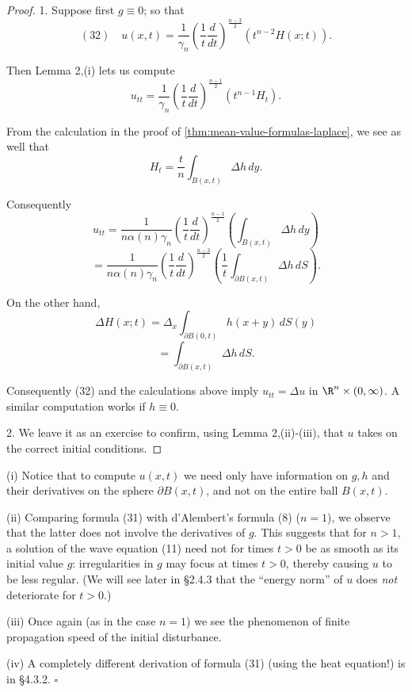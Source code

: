 \begin{proof}
1. Suppose first $g \equiv 0$; so that
$$(32) \quad u(x,t) = \frac{1}{\gamma_n}\left(\frac{1}{t}\frac{d}{dt}\right)^{\frac{n-3}{2}}\left(t^{n-2}H(x;t)\right).$$

Then Lemma 2,(i) lets us compute
$$u_{tt} = \frac{1}{\gamma_n}\left(\frac{1}{t}\frac{d}{dt}\right)^{\frac{n-1}{2}}\left(t^{n-1}H_t\right).$$

From the calculation in the proof of \cref{thm:mean-value-formulas-laplace}, we see as well that
$$H_t = \frac{t}{n}\int_{B(x,t)} \Delta h\,dy.$$

Consequently
$$u_{tt} = \frac{1}{n\alpha(n)\gamma_n}\left(\frac{1}{t}\frac{d}{dt}\right)^{\frac{n-1}{2}}\left(\int_{B(x,t)} \Delta h\,dy\right)$$
$$= \frac{1}{n\alpha(n)\gamma_n}\left(\frac{1}{t}\frac{d}{dt}\right)^{\frac{n-3}{2}}\left(\frac{1}{t}\int_{\partial B(x,t)} \Delta h\,dS\right).$$

On the other hand,
$$\Delta H(x;t) = \Delta_x \int_{\partial B(0,t)} h(x+y) \, dS(y)$$
$$= \int_{\partial B(x,t)} \Delta h \, dS.$$

Consequently (32) and the calculations above imply $u_{tt} = \Delta u$ in $\R^n \times (0,\infty)$. A similar computation works if $h \equiv 0$.

2. We leave it as an exercise to confirm, using Lemma 2,(ii)-(iii), that $u$ takes on the correct initial conditions.
\end{proof}

\begin{remark}
\label{rem:wave-equation-odd-dimension-remarks}
(i) Notice that to compute $u(x,t)$ we need only have information on $g, h$ and their derivatives on the sphere $\partial B(x,t)$, and not on the entire ball $B(x,t)$.

(ii) Comparing formula (31) with d'Alembert's formula (8) ($n = 1$), we observe that the latter does not involve the derivatives of $g$. This suggests that for $n > 1$, a solution of the wave equation (11) need not for times $t > 0$ be as smooth as its initial value $g$: irregularities in $g$ may focus at times $t > 0$, thereby causing $u$ to be less regular. (We will see later in \S2.4.3 that the ``energy norm'' of $u$ does \textit{not} deteriorate for $t > 0$.)

(iii) Once again (as in the case $n = 1$) we see the phenomenon of finite propagation speed of the initial disturbance.

(iv) A completely different derivation of formula (31) (using the heat equation!) is in \S4.3.2. $\square$
\end{remark}

